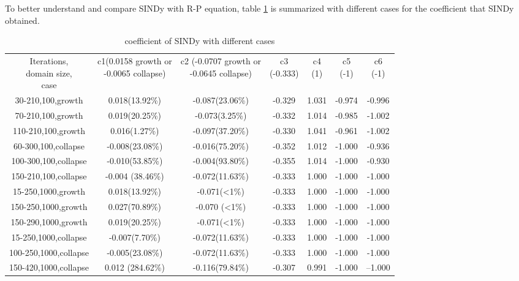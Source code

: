 \documentclass[review]{elsarticle}
\begin{document}
\newpage
To better understand and compare SINDy with R-P equation, table \ref{tab:SINDy-cases} is summarized with different cases for the coefficient that SINDy obtained.  
\begin{table}[ht]
	\centering
	\caption{coefficient of SINDy with different cases}
	\label{tab:SINDy-cases}
	\small
	\begin{tabular}{c c c c c c c}
		& & \\ %
		\hline
		\hline
		\makecell{Iterations,\\domain size,\\case} & \makecell{c1(0.0158 growth or\\ -0.0065 collapse) }& \makecell{c2 (-0.0707 growth or \\-0.0645 collapse) } & \makecell{c3\\(-0.333)} & \makecell{c4\\ (1) } & \makecell{c5\\ (-1)} & \makecell{c6\\ (-1) } \\
		\hline
		30-210,100,growth &0.018(13.92\%)			& -0.087(23.06\%)  	& -0.329  				& 1.031	& -0.974&-0.996\\
		70-210,100,growth &0.019(20.25\%)			& -0.073(3.25\%) 	& -0.332  				& 1.014	& -0.985&-1.002\\
		110-210,100,growth&		0.016(1.27\%)			& -0.097(37.20\%)  	& -0.330  				& 1.041	& -0.961&-1.002\\
		60-300,100,collapse&		-0.008(23.08\%)			& -0.016(75.20\%)  	& -0.352  				& 1.012	& -1.000&-0.936\\
		100-300,100,collapse&-0.010(53.85\%)		& -0.004(93.80\%)  	& -0.355 				& 1.014	& -1.000&-0.930\\
		150-210,100,collapse&-0.004	(38.46\%)		& -0.072(11.63\%)  	& -0.333  				& 1.000	& -1.000&-1.000\\
		15-250,1000,growth&0.018(13.92\%)			& -0.071(<1\%) 	& -0.333  				& 1.000	& -1.000&-1.000\\
		150-250,1000,growth&0.027(70.89\%)			& -0.070 (<1\%) 	& -0.333  				& 1.000	& -1.000&-1.000\\
		150-290,1000,growth&0.019(20.25\%)			& -0.071(<1\%)  	& -0.333  				& 1.000 	& -1.000 &-1.000 \\
		15-250,1000,collapse&-0.007(7.70\%)		& -0.072(11.63\%)  	& -0.333  				& 1.000	& -1.000&-1.000\\
		100-250,1000,collapse&-0.005(23.08\%)			& -0.072(11.63\%)  	&-0.333  				& 1.000	& -1.000&-1.000\\
		150-420,1000,collapse&0.012	(284.62\%)		& -0.116(79.84\%) 	& -0.307 				& 0.991	& -1.000&--1.000\\
		\hline
		\hline
	\end{tabular}
\end{table}
\end{document}
